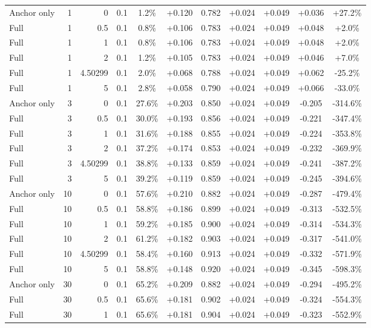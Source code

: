 \begin{table}[htbp]
\begin{tabular}{lrrrccccccc}
Anchor only & 1 & 0 & 0.1 & 1.2\% & +0.120 & 0.782 & +0.024 & +0.049 & +0.036 & +27.2\% \\
Full & 1 & 0.5 & 0.1 & 0.8\% & +0.106 & 0.783 & +0.024 & +0.049 & +0.048 & +2.0\% \\
Full & 1 & 1 & 0.1 & 0.8\% & +0.106 & 0.783 & +0.024 & +0.049 & +0.048 & +2.0\% \\
Full & 1 & 2 & 0.1 & 1.2\% & +0.105 & 0.783 & +0.024 & +0.049 & +0.046 & +7.0\% \\
Full & 1 & 4.50299 & 0.1 & 2.0\% & +0.068 & 0.788 & +0.024 & +0.049 & +0.062 & -25.2\% \\
Full & 1 & 5 & 0.1 & 2.8\% & +0.058 & 0.790 & +0.024 & +0.049 & +0.066 & -33.0\% \\
Anchor only & 3 & 0 & 0.1 & 27.6\% & +0.203 & 0.850 & +0.024 & +0.049 & -0.205 & -314.6\% \\
Full & 3 & 0.5 & 0.1 & 30.0\% & +0.193 & 0.856 & +0.024 & +0.049 & -0.221 & -347.4\% \\
Full & 3 & 1 & 0.1 & 31.6\% & +0.188 & 0.855 & +0.024 & +0.049 & -0.224 & -353.8\% \\
Full & 3 & 2 & 0.1 & 37.2\% & +0.174 & 0.853 & +0.024 & +0.049 & -0.232 & -369.9\% \\
Full & 3 & 4.50299 & 0.1 & 38.8\% & +0.133 & 0.859 & +0.024 & +0.049 & -0.241 & -387.2\% \\
Full & 3 & 5 & 0.1 & 39.2\% & +0.119 & 0.859 & +0.024 & +0.049 & -0.245 & -394.6\% \\
Anchor only & 10 & 0 & 0.1 & 57.6\% & +0.210 & 0.882 & +0.024 & +0.049 & -0.287 & -479.4\% \\
Full & 10 & 0.5 & 0.1 & 58.8\% & +0.186 & 0.899 & +0.024 & +0.049 & -0.313 & -532.5\% \\
Full & 10 & 1 & 0.1 & 59.2\% & +0.185 & 0.900 & +0.024 & +0.049 & -0.314 & -534.3\% \\
Full & 10 & 2 & 0.1 & 61.2\% & +0.182 & 0.903 & +0.024 & +0.049 & -0.317 & -541.0\% \\
Full & 10 & 4.50299 & 0.1 & 58.4\% & +0.160 & 0.913 & +0.024 & +0.049 & -0.332 & -571.9\% \\
Full & 10 & 5 & 0.1 & 58.8\% & +0.148 & 0.920 & +0.024 & +0.049 & -0.345 & -598.3\% \\
Anchor only & 30 & 0 & 0.1 & 65.2\% & +0.209 & 0.882 & +0.024 & +0.049 & -0.294 & -495.2\% \\
Full & 30 & 0.5 & 0.1 & 65.6\% & +0.181 & 0.902 & +0.024 & +0.049 & -0.324 & -554.3\% \\
Full & 30 & 1 & 0.1 & 65.6\% & +0.181 & 0.904 & +0.024 & +0.049 & -0.323 & -552.9\% \\

\end{tabular}
\end{table}
